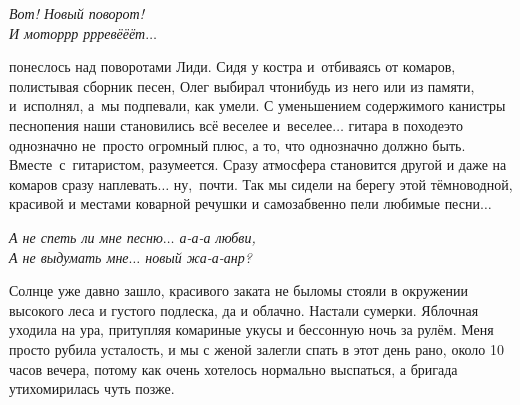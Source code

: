 \vspace{0.1cm}
\noindent\textit{%
	\hspace*{3.5cm}Вот! Новый поворот!\\
	\hspace*{3.5cm}И мотор\sdash р\sdash р  р\sdash р\sdash ревё\sdash ё\sdash ёт$\ldots$
}
\vspace{0.1cm}

\noindent\mdash понеслось над поворотами Лиди. Сидя у костра и~отбиваясь от комаров, полистывая сборник песен, Олег выбирал что\sdash нибудь из него или из памяти, и~исполнял, а~мы подпевали, как умели. С уменьшением содержимого канистры песнопения наши становились всё веселее и~веселее$\ldots$ гитара в походе\mdash это однозначно не~просто огромный плюс, а то, что однозначно должно быть. Вместе~с~гитаристом, разумеется. Сразу атмосфера становится другой и даже на комаров сразу наплевать$\ldots$ ну,~почти. Так мы сидели на берегу этой тёмноводной, красивой и местами коварной речушки и самозабвенно пели любимые песни$\ldots$

\vspace{0.1cm}
\noindent\textit{%
	\hspace*{2.0cm}А не спеть ли мне песню$\ldots$ а-а-а любви,\\
	\hspace*{2.0cm}А не выдумать мне$\ldots$ новый жа-а-анр?
}

Солнце уже давно зашло, красивого заката не было\mdash мы стояли в окружении высокого леса и густого подлеска, да и облачно. Настали сумерки. Яблочная уходила на ура, притупляя комариные укусы и бессонную ночь за рулём. Меня просто рубила усталость, и мы с женой залегли спать в этот день рано, около 10 часов вечера, потому как очень хотелось нормально выспаться, а бригада утихомирилась чуть позже.

\begin{center}
\end{center}
